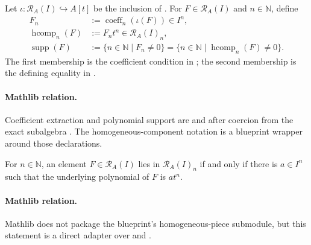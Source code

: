 \begin{definition}
  \label{def:nagata-rees-components}

  Let $\iota\colon\mathcal R_A(I)\hookrightarrow A[t]$ be the inclusion of
  .  For $F\in\mathcal R_A(I)$ and
  $n\in\mathbb N$, define
  \[
  \begin{aligned}
    F_n&:=\operatorname{coeff}_n(\iota(F))\in I^n,\\
    \operatorname{hcomp}_n(F)&:=F_nt^n\in\mathcal R_A(I)_n,\\
    \operatorname{supp}(F)
      &:=\{n\in\mathbb N\mid F_n\ne0\}
       =\{n\in\mathbb N\mid\operatorname{hcomp}_n(F)\ne0\}.
  \end{aligned}
  \]
  The first membership is the coefficient condition in
  ; the second membership is the defining
  equality in .

  \paragraph{Mathlib relation.}
  Coefficient extraction and polynomial support are
  \texttt{} and
  \texttt{} after coercion from the exact
  subalgebra \texttt{}.  The homogeneous-component
  notation is a blueprint wrapper around those declarations.
\end{definition}

\begin{lemma}
  \label{lemma:nagata-rees-piece-membership}

  For $n\in\mathbb N$, an element $F\in\mathcal R_A(I)$ lies in
  $\mathcal R_A(I)_n$ if and only if
  there is $a\in I^n$ such that the underlying polynomial of $F$ is
  $at^n$.

  \paragraph{Mathlib relation.}
  Mathlib does not package the blueprint's homogeneous-piece submodule, but
  this statement is a direct adapter over
  \texttt{} and
  \texttt{}.
\end{lemma}

